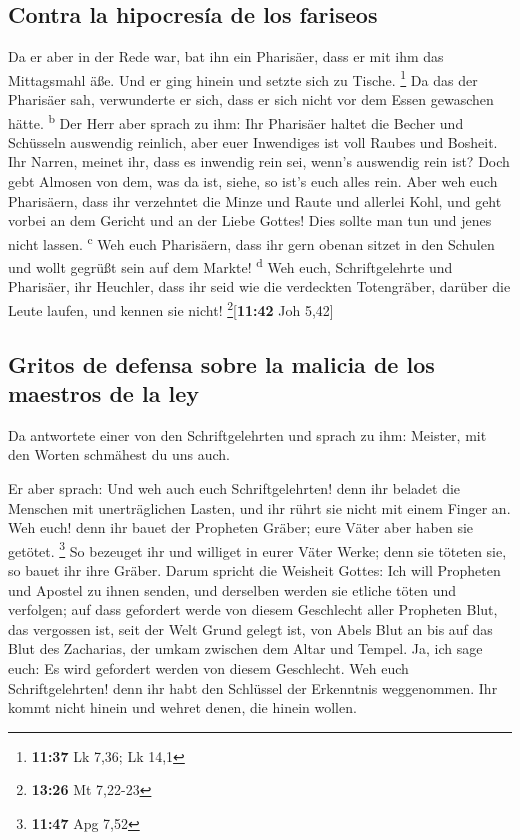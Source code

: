 \hypertarget{contra-la-hipocresuxeda-de-los-fariseos}{%
\subsection{Contra la hipocresía de los
fariseos}\label{contra-la-hipocresuxeda-de-los-fariseos}}

 Da er aber in der Rede war, bat ihn ein Pharisäer, dass
er mit ihm das Mittagsmahl äße. Und er ging hinein und setzte sich zu
Tische. \footnote{\textbf{11:37} Lk 7,36; Lk 14,1}  Da
das der Pharisäer sah, verwunderte er sich, dass er sich nicht vor dem
Essen gewaschen hätte. \textsuperscript{b}  Der Herr aber
sprach zu ihm: Ihr Pharisäer haltet die Becher und Schüsseln auswendig
reinlich, aber euer Inwendiges ist voll Raubes und Bosheit.
 Ihr Narren, meinet ihr, dass es inwendig rein sei,
wenn's auswendig rein ist?  Doch gebt Almosen von dem,
was da ist, siehe, so ist's euch alles rein.  Aber weh
euch Pharisäern, dass ihr verzehntet die Minze und Raute und allerlei
Kohl, und geht vorbei an dem Gericht und an der Liebe Gottes! Dies
sollte man tun und jenes nicht lassen. \textsuperscript{c}
 Weh euch Pharisäern, dass ihr gern obenan sitzet in den
Schulen und wollt gegrüßt sein auf dem Markte! \textsuperscript{d}
 Weh euch, Schriftgelehrte und Pharisäer, ihr Heuchler,
dass ihr seid wie die verdeckten Totengräber, darüber die Leute laufen,
und kennen sie nicht! \footnote{\textbf{13:26} Mt 7,22-23}{[}\textbf{11:42}
Joh 5,42{]}

\hypertarget{gritos-de-defensa-sobre-la-malicia-de-los-maestros-de-la-ley}{%
\subsection{Gritos de defensa sobre la malicia de los maestros de la
ley}\label{gritos-de-defensa-sobre-la-malicia-de-los-maestros-de-la-ley}}

 Da antwortete einer von den Schriftgelehrten und sprach
zu ihm: Meister, mit den Worten schmähest du uns auch.

 Er aber sprach: Und weh auch euch Schriftgelehrten! denn
ihr beladet die Menschen mit unerträglichen Lasten, und ihr rührt sie
nicht mit einem Finger an.  Weh euch! denn ihr bauet der
Propheten Gräber; eure Väter aber haben sie getötet. \footnote{\textbf{11:47}
  Apg 7,52}  So bezeuget ihr und williget in eurer Väter
Werke; denn sie töteten sie, so bauet ihr ihre Gräber. 
Darum spricht die Weisheit Gottes: Ich will Propheten und Apostel zu
ihnen senden, und derselben werden sie etliche töten und verfolgen;
 auf dass gefordert werde von diesem Geschlecht aller
Propheten Blut, das vergossen ist, seit der Welt Grund gelegt ist,
 von Abels Blut an bis auf das Blut des Zacharias, der
umkam zwischen dem Altar und Tempel. Ja, ich sage euch: Es wird
gefordert werden von diesem Geschlecht.  Weh euch
Schriftgelehrten! denn ihr habt den Schlüssel der Erkenntnis
weggenommen. Ihr kommt nicht hinein und wehret denen, die hinein wollen.

